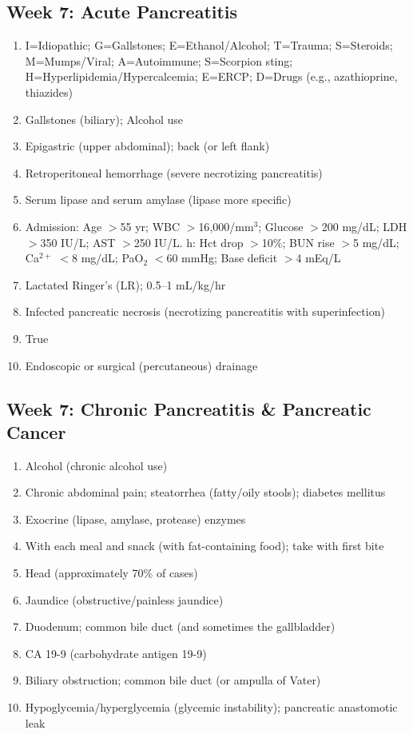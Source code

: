 \documentclass[11pt,letterpaper]{article}
\begin{document}
\begin{keybox}
\subsection*{Week 7: Acute Pancreatitis}
\begin{enumerate}[leftmargin=1.5em,label=\textbf{\arabic*.},start=21]
  \item I=Idiopathic; G=Gallstones; E=Ethanol/Alcohol; T=Trauma; S=Steroids;
        M=Mumps/Viral; A=Autoimmune; S=Scorpion sting; H=Hyperlipidemia/Hypercalcemia;
        E=ERCP; D=Drugs (e.g., azathioprine, thiazides)
  \item Gallstones (biliary); Alcohol use
  \item Epigastric (upper abdominal); back (or left flank)
  \item Retroperitoneal hemorrhage (severe necrotizing pancreatitis)
  \item Serum lipase and serum amylase (lipase more specific)
  \item Admission: Age $>$55 yr; WBC $>$16{,}000/mm$^3$; Glucose $>$200 mg/dL;
        LDH $>$350 IU/L; AST $>$250 IU/L. h: Hct drop $>$10\%; BUN rise $>$5 mg/dL; Ca$^{2+}$ $<$8 mg/dL;
        PaO$_2$ $<$60 mmHg; Base deficit $>$4 mEq/L
  \item Lactated Ringer's (LR); 0.5--1 mL/kg/hr
  \item Infected pancreatic necrosis (necrotizing pancreatitis with superinfection)
  \item True
  \item Endoscopic or surgical (percutaneous) drainage
\end{enumerate}

\hrulefill
\subsection*{Week 7: Chronic Pancreatitis \& Pancreatic Cancer}
\begin{enumerate}[leftmargin=1.5em,label=\textbf{\arabic*.},start=31]
  \item Alcohol (chronic alcohol use)
  \item Chronic abdominal pain; steatorrhea (fatty/oily stools); diabetes mellitus
  \item Exocrine (lipase, amylase, protease) enzymes
  \item With each meal and snack (with fat-containing food); take with first bite
  \item Head (approximately 70\% of cases)
  \item Jaundice (obstructive/painless jaundice)
  \item Duodenum; common bile duct (and sometimes the gallbladder)
  \item CA 19-9 (carbohydrate antigen 19-9)
  \item Biliary obstruction; common bile duct (or ampulla of Vater)
  \item Hypoglycemia/hyperglycemia (glycemic instability); pancreatic anastomotic leak
\end{enumerate}


\end{keybox}
\end{document}
